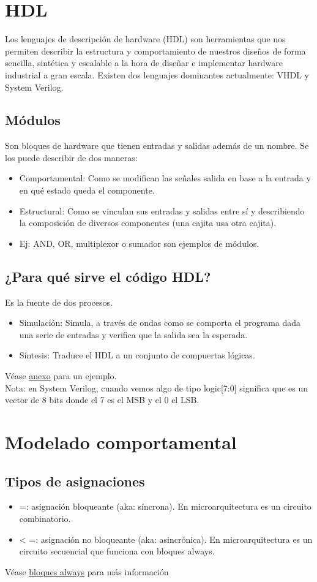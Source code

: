 \documentclass[10pt,a4paper]{article}
\begin{document}
\section*{HDL}
Los lenguajes de descripción de hardware (HDL) son herramientas que nos permiten describir la estructura y comportamiento de nuestros diseños de forma sencilla, sintética y escalable a la hora de diseñar e implementar hardware industrial a gran escala.
Existen dos lenguajes dominantes actualmente: VHDL y System Verilog. 
\subsection*{Módulos}
Son bloques de hardware que tienen entradas y salidas además de un nombre. Se los puede describir de dos maneras:
\begin{itemize}
    \item Comportamental: Como se modifican las señales salida en base a la entrada y en qué estado queda el componente.
    \item Estructural: Como se vinculan sus entradas y salidas entre sí y describiendo la composición de diversos componentes (una cajita usa otra cajita).
    \item Ej: AND, OR, multiplexor o sumador son ejemplos de módulos.
\end{itemize}
\subsection*{¿Para qué sirve el código HDL?}
Es la fuente de dos procesos.
\begin{itemize}
    \item Simulación: Simula, a través de ondas como se comporta el programa dada una serie de entradas y verifica que la salida sea la esperada.
    \item Síntesis: Traduce el HDL a un conjunto de compuertas lógicas.
\end{itemize}
Véase \hyperref[subsec:SVL_S_S]{\underline{anexo}} para un ejemplo. \\ 
Nota: en System Verilog, cuando vemos algo de tipo logic[7:0] significa que es un vector de 8 bits donde el 7 es el MSB y el 0 el LSB.
\section*{Modelado comportamental}
\subsection*{Tipos de asignaciones}
\begin{itemize}
    \item =: asignación bloqueante (aka: síncrona). En microarquitectura es un circuito combinatorio. 
    \item < =: asignación no bloqueante (aka: asincrónica). En microarquitectura es un circuito secuencial que funciona con bloques always. 
\end{itemize}
Véase \hyperref[subsec:bloques_always]{\underline{bloques always}} para más información
\end{document}
